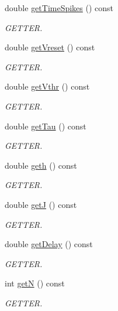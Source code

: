 \begin{DoxyCompactItemize}
double \hyperlink{classNeuron_a13b7bf51bf586b16137dd16cf746d05d}{get\-Time\-Spikes} () const 
\begin{DoxyCompactList}\small\item\em G\-E\-T\-T\-E\-R. \end{DoxyCompactList}\item 
double \hyperlink{classNeuron_ab0ed311cbece1a842ba31c33c6dc5dff}{get\-Vreset} () const 
\begin{DoxyCompactList}\small\item\em G\-E\-T\-T\-E\-R. \end{DoxyCompactList}\item 
double \hyperlink{classNeuron_a54020707519e2d6d0439a5783c2c7eae}{get\-Vthr} () const 
\begin{DoxyCompactList}\small\item\em G\-E\-T\-T\-E\-R. \end{DoxyCompactList}\item 
double \hyperlink{classNeuron_a7975f57efc1b76bb6cd56b51a902b606}{get\-Tau} () const 
\begin{DoxyCompactList}\small\item\em G\-E\-T\-T\-E\-R. \end{DoxyCompactList}\item 
double \hyperlink{classNeuron_adbe1dbd4186b3824b0882c41c0607bf8}{geth} () const 
\begin{DoxyCompactList}\small\item\em G\-E\-T\-T\-E\-R. \end{DoxyCompactList}\item 
double \hyperlink{classNeuron_a320ab48e220523371b266385c650e31f}{get\-J} () const 
\begin{DoxyCompactList}\small\item\em G\-E\-T\-T\-E\-R. \end{DoxyCompactList}\item 
double \hyperlink{classNeuron_ad87cfbd4f9f22155180692a2743a3618}{get\-Delay} () const 
\begin{DoxyCompactList}\small\item\em G\-E\-T\-T\-E\-R. \end{DoxyCompactList}\item 
int \hyperlink{classNeuron_a056ca88e9692b264a40176004ec1b877}{get\-N} () const 
\begin{DoxyCompactList}\small\item\em G\-E\-T\-T\-E\-R. \end{DoxyCompactList}\item 

\end{DoxyCompactItemize}
